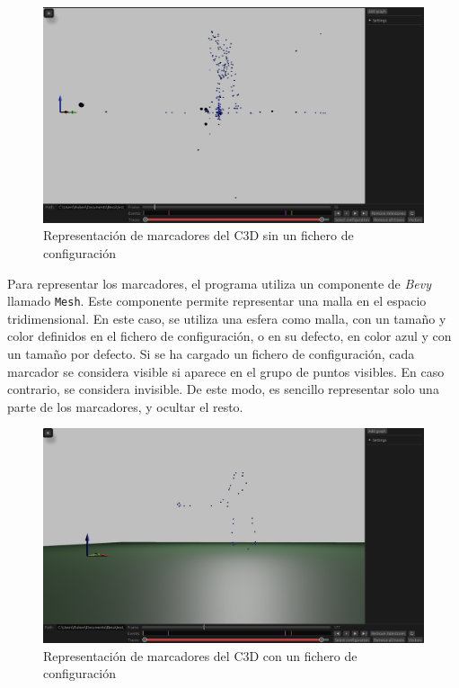\begin{figure}[H]
  \centering
  \includegraphics[width=\textwidth]{imagenes/marcadores.png}
  \caption{Representación de marcadores del \ac{C3D} sin un fichero de configuración}
  \label{fig:marcadores}
\end{figure}

Para representar los marcadores, el programa utiliza un componente de \textit{Bevy} llamado \texttt{Mesh}. Este componente permite representar una malla en el espacio tridimensional. En este caso, se utiliza una esfera como malla, con un tamaño y color definidos en el fichero de configuración, o en su defecto, en color azul y con un tamaño por defecto. Si se ha cargado un fichero de configuración, cada marcador se considera visible si aparece en el grupo de puntos visibles. En caso contrario, se considera invisible. De este modo, es sencillo representar solo una parte de los marcadores, y ocultar el resto.

\begin{figure}[H]
  \centering
  \includegraphics[width=\textwidth]{imagenes/config-basica.png}
  \caption{Representación de marcadores del \ac{C3D} con un fichero de configuración}
  \label{fig:cfg-basica}
\end{figure}

